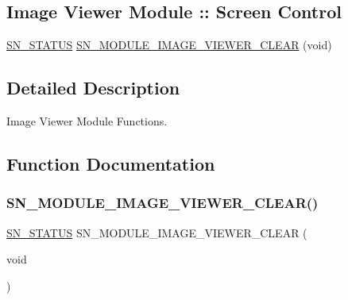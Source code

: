 \subsection*{Image Viewer Module \+:\+: Screen Control}
\begin{DoxyCompactItemize}
\item 
\hyperlink{group__SYSTEM__ERROR_ga4540713b9a7a18ce44d78c3a10f7442f}{S\+N\+\_\+\+S\+T\+A\+T\+US} \hyperlink{group__MODULE__IMAGE__VIEWER_ga77d2b7a49b61f4edf67ffc2466a032dd}{S\+N\+\_\+\+M\+O\+D\+U\+L\+E\+\_\+\+I\+M\+A\+G\+E\+\_\+\+V\+I\+E\+W\+E\+R\+\_\+\+C\+L\+E\+AR} (void)
\end{DoxyCompactItemize}


\subsection{Detailed Description}
Image Viewer Module Functions. 



\subsection{Function Documentation}
\mbox{\label{group__MODULE__IMAGE__VIEWER_ga77d2b7a49b61f4edf67ffc2466a032dd}} 
\subsubsection{\texorpdfstring{S\+N\+\_\+\+M\+O\+D\+U\+L\+E\+\_\+\+I\+M\+A\+G\+E\+\_\+\+V\+I\+E\+W\+E\+R\+\_\+\+C\+L\+E\+A\+R()}{SN\_MODULE\_IMAGE\_VIEWER\_CLEAR()}}
{\footnotesize\ttfamily \hyperlink{group__SYSTEM__ERROR_ga4540713b9a7a18ce44d78c3a10f7442f}{S\+N\+\_\+\+S\+T\+A\+T\+US} S\+N\+\_\+\+M\+O\+D\+U\+L\+E\+\_\+\+I\+M\+A\+G\+E\+\_\+\+V\+I\+E\+W\+E\+R\+\_\+\+C\+L\+E\+AR (\begin{DoxyParamCaption}\item[{void}]{ }\end{DoxyParamCaption})}



